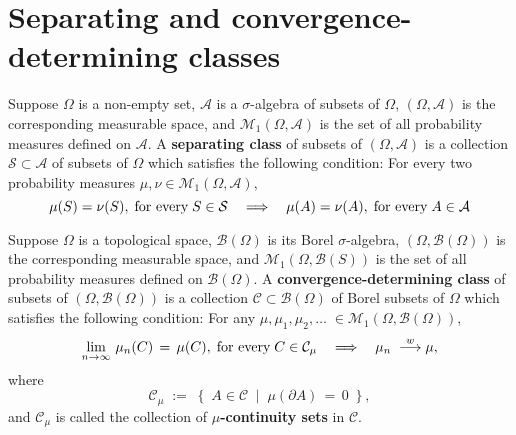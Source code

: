 

\section{Separating and convergence-determining classes}
\setcounter{theorem}{0}
\setcounter{equation}{0}

\renewcommand{\theenumi}{\roman{enumi}}
\renewcommand{\labelenumi}{\textnormal{(\theenumi)}$\;\;$}

\begin{definition}
\mbox{}\vskip 0.1cm
\noindent
Suppose $\Omega$ is a non-empty set, $\mathcal{A}$ is a $\sigma$-algebra of subsets of $\Omega$,
$(\Omega,\mathcal{A})$ is the corresponding measurable space, and
$\mathcal{M}_{1}\!\left(\Omega,\mathcal{A}\right)$ is the set of all probability measures defined
on $\mathcal{A}$.
A \textbf{separating class} of subsets of $\left(\Omega,\mathcal{A}\right)$ is
a collection $\mathcal{S} \subset \mathcal{A}$ of subsets of $\Omega$
which satisfies the following condition:
For every two probability measures $\mu, \nu \in \mathcal{M}_{1}\!\left(\Omega,\mathcal{A}\right)$,
\begin{equation*}
\mu(S) = \nu(S), \;\textnormal{for every}\; S \in \mathcal{S}
\quad\Longrightarrow\quad
\mu(A) = \nu(A), \;\textnormal{for every}\; A \in \mathcal{A}		
\end{equation*}
\end{definition}

\begin{definition}
\mbox{}\vskip 0.1cm
\noindent
Suppose $\Omega$ is a topological space, $\mathcal{B}(\Omega)$ is its Borel $\sigma$-algebra,
$(\Omega,\mathcal{B}(\Omega))$ is the corresponding measurable space, and
$\mathcal{M}_{1}\!\left(\Omega,\mathcal{B}(S)\right)$ is the set of all probability measures defined
on $\mathcal{B}(\Omega)$.
A \textbf{convergence-determining class} of subsets of $\left(\Omega,\mathcal{B}(\Omega)\right)$ is
a collection $\mathcal{C} \subset \mathcal{B}(\Omega)$ of Borel subsets of $\Omega$
which satisfies the following condition:
For any $\mu, \mu_{1}, \mu_{2}, \ldots\; \in \mathcal{M}_{1}\!\left(\Omega,\mathcal{B}(\Omega)\right)$,
\begin{equation*}
\lim_{n\rightarrow\infty}\,\mu_{n}(C) \, = \, \mu(C), \;\textnormal{for every}\; C \in \mathcal{C}_{\mu}
\quad\Longrightarrow\quad
\mu_{n} \; \overset{w}{\longrightarrow} \mu,
\end{equation*}
where
\begin{equation*}
\mathcal{C}_{\mu} \; := \;
\left\{\;
A \in \mathcal{C}
\;\;\vert\;\;
\mu(\partial A) \,=\, 0
\;\right\},
\end{equation*}
and $\mathcal{C}_{\mu}$ is called the collection of \textbf{$\mu$-continuity sets} in $\mathcal{C}$.
\end{definition}

